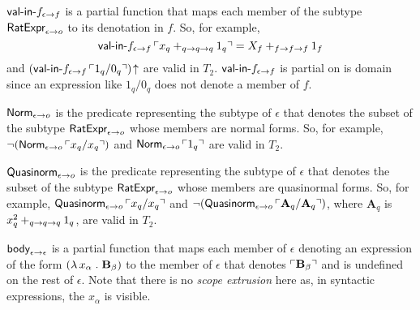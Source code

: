 \documentclass[fleqn]{llncs}
\begin{document}
  \item \bsp $\mbox{\sf val-in-}f_{\epsilon \rightarrow f}$ is a partial
    function that maps each member of the subtype
    $\mbox{\sf RatExpr}_{\epsilon \rightarrow o}$ to its denotation in $f$.
    So, for example, \[\mbox{\sf val-in-}f_{\epsilon \rightarrow f} \,
    \ulcorner x_q +_{q \rightarrow q \rightarrow q} 1_q\urcorner = X_f +_{f \rightarrow f
      \rightarrow f} 1_f\] and $(\mbox{\sf val-in-}f_{\epsilon \rightarrow f} \,
    \ulcorner1_q/0_q\urcorner)\!\uparrow$ are valid in $T_2$. 
    $\mbox{\sf val-in-}f_{\epsilon \rightarrow f}$ is partial on is domain
    since an expression like $1_q/0_q$ does not denote a
    member of $f$. \esp

  \item \bsp $\mbox{\sf Norm}_{\epsilon \rightarrow o}$ is the predicate
    representing the subtype of $\epsilon$ that denotes the subset of
    the subtype $\mbox{\sf RatExpr}_{\epsilon \rightarrow o}$ whose members
    are normal forms.  So, for example, $\neg(\mbox{\sf Norm}_{\epsilon
      \rightarrow o} \, \ulcorner x_q/x_q\urcorner)$ and $\mbox{\sf Norm}_{\epsilon
      \rightarrow o} \, \ulcorner1_q\urcorner$ are valid in $T_2$.\esp

  \item \bsp $\mbox{\sf Quasinorm}_{\epsilon \rightarrow o}$ is the predicate
    representing the subtype of $\epsilon$ that denotes the subset of
    the subtype $\mbox{\sf RatExpr}_{\epsilon \rightarrow o}$ whose members
    are quasinormal forms.  So, for example,
    $\mbox{\sf Quasinorm}_{\epsilon \rightarrow o} \, \ulcorner x_q/x_q\urcorner$ and
    $\neg(\mbox{\sf Quasinorm}_{\epsilon \rightarrow o} \,
    \ulcorner\textbf{A}_q/\textbf{A}_q\urcorner)$, where $\textbf{A}_q$ is
    $x^{2}_{q} +_{q \rightarrow q \rightarrow q} 1_q$, are valid in
    $T_2$. \esp

  \item $\mbox{\sf body}_{\epsilon \rightarrow \epsilon}$ is a partial
    function that maps each member of $\epsilon$ denoting an
    expression of the form $(\lambda\, x_\alpha \mathrel.
    \textbf{B}_\beta)$ to the member of $\epsilon$ that denotes
    $\ulcorner\textbf{B}_\beta\urcorner$ and is undefined on the rest of $\epsilon$.
    Note that there is no \emph{scope extrusion} here as, in syntactic
    expressions, the $x_{\alpha}$ is visible.

\ee
\end{document}

